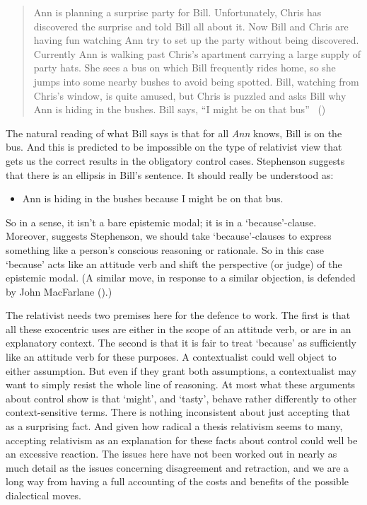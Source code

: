 \documentclass[
  11pt,
  letterpaper,
  DIV=11,
  numbers=noendperiod,
  twoside]{scrartcl}
\providecommand{\tightlist}{%
  \setlength{\itemsep}{0pt}\setlength{\parskip}{0pt}}
\begin{document}
\begin{quote}
Ann is planning a surprise party for Bill. Unfortunately, Chris has
discovered the surprise and told Bill all about it. Now Bill and Chris
are having fun watching Ann try to set up the party without being
discovered. Currently Ann is walking past Chris's apartment carrying a
large supply of party hats. She sees a bus on which Bill frequently
rides home, so she jumps into some nearby bushes to avoid being spotted.
Bill, watching from Chris's window, is quite amused, but Chris is
puzzled and asks Bill why Ann is hiding in the bushes. Bill says, ``I
might be on that bus'' ~()
\end{quote}

The natural reading of what Bill says is that for all \emph{Ann} knows,
Bill is on the bus. And this is predicted to be impossible on the type
of relativist view that gets us the correct results in the obligatory
control cases. Stephenson suggests that there is an ellipsis in Bill's
sentence. It should really be understood as:

\begin{itemize}
\tightlist
\item
  Ann is hiding in the bushes because I might be on that bus.
\end{itemize}

So in a sense, it isn't a bare epistemic modal; it is in a
`because'-clause. Moreover, suggests Stephenson, we should take
`because'-clauses to express something like a person's conscious
reasoning or rationale. So in this case `because' acts like an attitude
verb and shift the perspective (or judge) of the epistemic modal. (A
similar move, in response to a similar objection, is defended by John
MacFarlane ().)

The relativist needs two premises here for the defence to work. The
first is that all these exocentric uses are either in the scope of an
attitude verb, or are in an explanatory context. The second is that it
is fair to treat `because' as sufficiently like an attitude verb for
these purposes. A contextualist could well object to either assumption.
But even if they grant both assumptions, a contextualist may want to
simply resist the whole line of reasoning. At most what these arguments
about control show is that `might', and `tasty', behave rather
differently to other context-sensitive terms. There is nothing
inconsistent about just accepting that as a surprising fact. And given
how radical a thesis relativism seems to many, accepting relativism as
an explanation for these facts about control could well be an excessive
reaction. The issues here have not been worked out in nearly as much
detail as the issues concerning disagreement and retraction, and we are
a long way from having a full accounting of the costs and benefits of
the possible dialectical moves.
\end{document}

